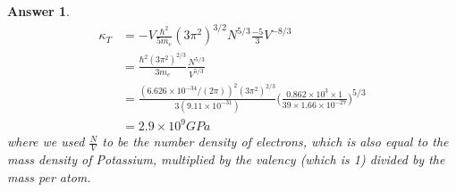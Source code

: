 \documentclass[a4paper]{article}
\newtheorem{ans}{Answer}[subsection]
\theoremstyle{new}
\begin{document}
\begin{ans}
\begin{align}
\kappa_T&=-V\frac{\hbar^2}{5m_e}(3\pi^2)^{3/2}N^{5/3}\frac{-5}{3}V^{-8/3}\nonumber\\&=\frac{\hbar^2(3\pi^2)^{2/3}}{3m_e}\frac{N^{5/3}}{V^{5/3}}\nonumber\\&=\frac{(6.626\times10^{-34}/(2\pi))^2(3\pi^2)^{2/3}}{3(9.11\times10^{-31})}\bigg(\frac{0.862\times10^3\times 1}{39\times 1.66\times10^{-27}}\bigg)^{5/3}\nonumber\\&=2.9\times10^9GPa\nonumber
\end{align}
where we used $\frac{N}{V}$ to be the number density of electrons, which is also equal to the mass density of Potassium, multiplied by the valency (which is 1) divided by the mass per atom.
\end{ans}
\newpage
\end{document}

